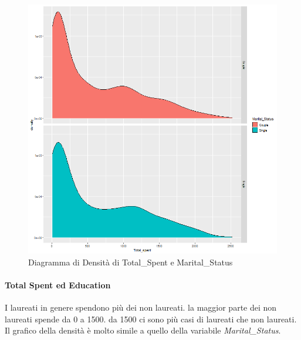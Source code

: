 \documentclass[letterpaper,11pt]{article}
\begin{document}
\begin{figure}[h]
\begin{minipage}[b]{0.4\textwidth}
    \includegraphics[width=\textwidth]{Img/EDA/EDA027.png}
    \caption{Diagramma di Densità di Total\_Spent e Marital\_Status }
     \label{fig:DensitaTsMaritalStatus}
  \end{minipage}
\end{figure}

\paragraph{Total Spent ed Education}
I laureati in genere spendono più dei non laureati. la maggior parte dei non laureati spende da 0 a 1500. da 1500 ci sono più casi di laureati che non laureati.
Il grafico della densità   è molto simile a quello della variabile \textit{Marital\_Status}.
\end{document}
